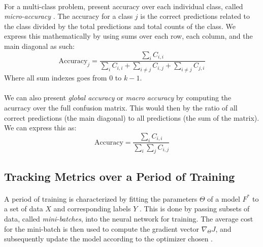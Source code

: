 \documentclass[12pt,letterpaper]{article}
\begin{document}
\paragraph*{}For a multi-class problem, present accuracy over each individual class, called \textit{micro-accuracy} \cite{James}. The accuracy for a class $j$ is the correct predictions related to the class divided by the total predictions and total counts of the class. We express this mathematically by using sums over each row, each column, and the main diagonal as such:
\begin{equation}
\label{eqn-Accuracy}
\text{Accuracy}_j = \frac{\sum_{i}C_{i,i}}{\sum_{i}C_{i,i} + \sum_{i \neq j}C_{i,j} + \sum_{i \neq j}C_{j,i}}
\end{equation}
Where all sum indexes goes from $0$ to $k-1$.

\paragraph*{}We can also present \textit{global accuracy} or \textit{macro accuracy} by computing the acurracy over the full confusion matrix. This would then by the ratio of all correct predictions (the main diagonal) to all predictions (the sum of the matrix). We can express this as:
\begin{equation}
\text{Accuracy} = \frac{\sum_{i}C_{i,i}}{\sum_{i}\sum_{j}C_{i,j}}
\end{equation}


\subsection{Tracking Metrics over a Period of Training}
\label{subsec-TrainingMetrics}

\paragraph*{}A period of training is characterized by fitting the parameters $\Theta$ of a model $F^*$ to a set of data $X$ and corresponding labels $Y$ \cite{Goodfellow,Virtanen}. This is done by passing subsets of data, called \textit{mini-batches}, into the neural network for training. The average cost for the mini-batch is then used to compute the gradient vector $\nabla_{\Theta}J$, and subsequently update the model according to the optimizer chosen \cite{Geron,Goodfellow}. 
\end{document}
